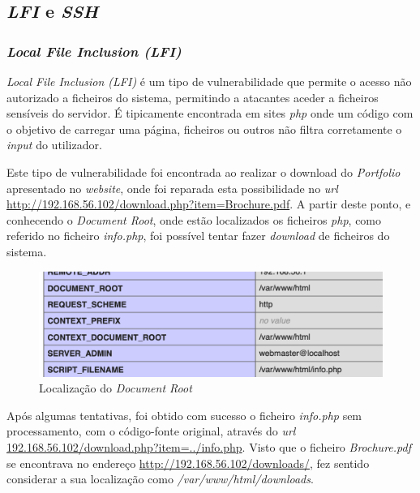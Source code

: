 \documentclass[10pt,english]{article}
\begin{document}
\subsection{\textit{LFI} e \textit{SSH}}

\subsubsection{\textit{Local File Inclusion (LFI)}}

\par \textit{Local File Inclusion (LFI)} é um tipo de vulnerabilidade que permite o acesso não autorizado a ficheiros do sistema, permitindo a atacantes aceder a ficheiros sensíveis do servidor. É tipicamente encontrada em sites \textit{php} onde um código com o objetivo de carregar uma página, ficheiros ou outros não filtra corretamente o \textit{input} do utilizador.

\par Este tipo de vulnerabilidade foi encontrada ao realizar o download do \textit{Portfolio} apresentado no \textit{website}, onde foi reparada esta possibilidade no \textit{url} \url{http://192.168.56.102/download.php?item=Brochure.pdf}. A partir deste ponto, e conhecendo o \textit{Document Root}, onde estão localizados os ficheiros \textit{php}, como referido no ficheiro \textit{info.php}, foi possível tentar fazer \textit{download} de ficheiros do sistema.


\begin{figure}[!h]
        \centering
        \includegraphics[width=\textwidth]{images/info.png}
        \caption{Localização do \textit{Document Root}}
\end{figure}

\par Após algumas tentativas, foi obtido com sucesso o ficheiro \textit{info.php} sem processamento, com o código-fonte original, através do \textit{url} \url{192.168.56.102/download.php?item=../info.php}. Visto que o ficheiro \textit{Brochure.pdf} se encontrava no endereço \url{http://192.168.56.102/downloads/}, fez sentido considerar a sua localização como \textit{/var/www/html/downloads}.
\end{document}
